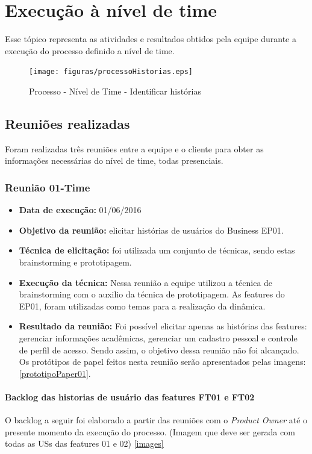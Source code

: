 \chapter[Execução à nível de time]{Execução à nível de time}

Esse tópico representa as atividades e resultados obtidos pela equipe durante a execução do processo definido a nível de time.

\begin{figure}[H]
    \centering
    \label{identificarHistorias}
    \texttt{[image: figuras/processoHistorias.eps]}
    \caption[Identificar histórias]{Processo - Nível de Time - Identificar histórias}
\end{figure}


\section{Reuniões realizadas}
Foram realizadas três reuniões entre a equipe e o cliente para obter as informações necessárias do nível de time, todas presenciais.

\subsection{Reunião 01-Time}
\begin{itemize}
 \item \textbf{Data de execução:} 01/06/2016
 \item \textbf{Objetivo da reunião:} elicitar histórias de usuários do Business EP01.
 \item \textbf{Técnica de elicitação:} foi utilizada um conjunto de técnicas, sendo estas brainstorming e prototipagem.
 \item \textbf{Execução da técnica:} Nessa reunião a equipe utilizou a técnica de brainstorming com o auxilio da técnica de prototipagem. As features do EP01, foram utilizadas como temas para a realização da dinâmica.
 \item \textbf{Resultado da reunião:} Foi possível elicitar apenas as histórias das features: gerenciar informações acadêmicas, gerenciar um cadastro pessoal e controle de perfil de acesso. Sendo assim, o objetivo dessa reunião não foi alcançado. Os protótipos de papel feitos nesta reunião serão apresentados pelas imagens: \ref{prototipoPaper01}.
\end{itemize}

\subsubsection{Backlog das historias de usuário das features FT01 e FT02}
 O backlog a seguir foi elaborado a partir das reuniões com o \textit{Product Owner} até o presente momento da execução do processo.
 (Imagem que deve ser gerada com todas as USs das features 01 e 02)
 \ref{images}

